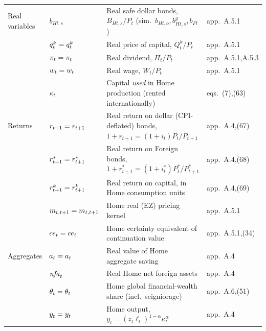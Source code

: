 \begin{longtable}{@{}p{2.55cm} p{2.0cm} p{7.2cm} p{2.4cm}@{}}
Real variables   & $b_{Ht,s}$               & Real safe dollar bonds, $B_{Ht,s}/P_t$ (sim.\ $b_{Ht,o},b^g_{Ht,s},b_{Ft}$)    & app.\ A.5.1 \\
                 & $q^{k}_t=q^k_t$            & Real price of capital, $Q^k_t/P_t$                                              & app.\ A.5.1 \\
                 & $\pi_t=\pi_t$          & Real dividend, $\Pi_t/P_t$                                                      & app.\ A.5.1,A.5.3 \\
                 & $w_t=w_t$              & Real wage, $W_t/P_t$                                                            & app.\ A.5.1 \\
                 & $\kappa_t$               & Capital \emph{used} in Home production (rented internationally)                 & eqs.\ (7),(63) \\
Returns          & $r_{t+1}=r_{t+1}$      & Real return on dollar (CPI-deflated) bonds, $1+r_{t+1}=(1+i_t)P_t/P_{t+1}$      & app.\ A.4,(67) \\
                 & $r^{*}_{t+1}=r^{*}_{t+1}$ & Real return on Foreign bonds, $1+r^{*}_{t+1}=(1+i^{*}_t)P^{*}_t/P^{*}_{t+1}$  & app.\ A.4,(68) \\
                 & $r^{k}_{t+1}=r^k_{t+1}$    & Real return on capital, in Home consumption units                              & app.\ A.4,(69) \\
                 & $m_{t,t+1}=m_{t,t+1}$  & Home real (EZ) pricing kernel                                                   & app.\ A.5.1 \\
                 & $ce_t=ce_t$            & Home certainty equivalent of continuation value                                & app.\ A.5.1,(34) \\
Aggregates       & $a_t=a_t$            & Real value of Home aggregate saving                                            & app.\ A.4 \\
                 & $\mathit{nfa}_t$                 & Real Home net foreign assets                                                    & app.\ A.4 \\
                 & $\theta_t=\theta_t$        & Home global financial-wealth share (incl.\ seigniorage)                         & app.\ A.6,(51) \\
                 & $y_t=y_t$             & Home output, $y_t=(z_t\ell_t)^{1-\alpha}\kappa_t^{\alpha}$                      & app.\ A.4 \\

\end{longtable}
